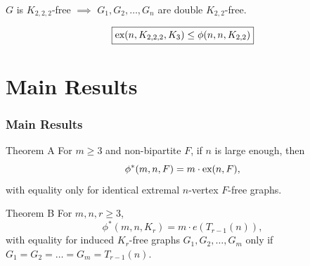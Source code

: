 \documentclass{beamer}
\newcommand*{\ex}{\textnormal{ex}}
\begin{document}
\begin{frame}
  \pause

  \vspace{0.1cm}

  \begin{center}
    $G$ is $K_{2,2,2}$-free $\implies$ $G_1, G_2, \ldots, G_n$ are double $K_{2, 2}$-free.
  \end{center}

  \pause

  \[
    \boxed{\ex(n, K_{2,2,2}, K_3) \leq \phi(n, n, K_{2,2})}
  \]
\end{frame}

\section{Main Results}

\begin{frame}
  \frametitle{Main Results}


  \begin{block}{Theorem A}
    For $m \geq 3$ and non-bipartite $F$, if $n$ is large enough, then
    \[
      \phi^*(m, n, F) = m \cdot \ex(n, F),
    \]
    with equality only for identical extremal $n$-vertex $F$-free graphs.
  \end{block}

  \pause

  \begin{block}{Theorem B}
    For $m, n, r \geq 3$,
    \[
      \phi^*(m,n,K_{r}) = m \cdot e(T_{r - 1}(n)),
    \]
    with equality for induced $K_{r}$-free graphs $G_1, G_2, \dots, G_m$ only if $G_1 = G_2 = \dots = G_m = T_{r - 1}(n)$.  
  \end{block}
\end{frame}
\end{document}

